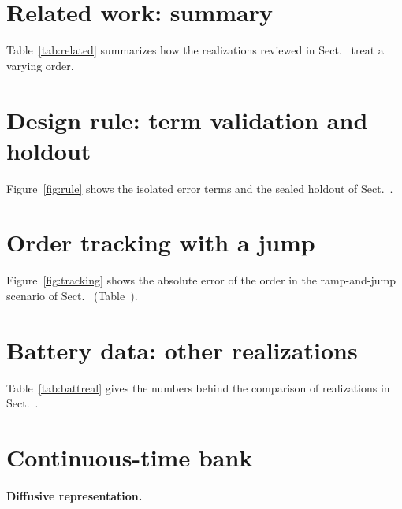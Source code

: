 \ifsp


\section{Related work: summary}\label{sup:related}
Table~\ref{tab:related} summarizes how the realizations reviewed in Sect.~ treat a varying order.



\section{Design rule: term validation and holdout}\label{sup:rule}
Figure~\ref{fig:rule} shows the isolated error terms and the sealed holdout of Sect.~.



\section{Order tracking with a jump}\label{sup:tracking}
Figure~\ref{fig:tracking} shows the absolute error of the order in the ramp-and-jump scenario of Sect.~ (Table~).



\section{Battery data: other realizations}\label{sup:battreal}
Table~\ref{tab:battreal} gives the numbers behind the comparison of realizations in Sect.~.


\fi

\section{Continuous-time bank}\label{sup:ctbank}
\paragraph{Diffusive representation.}

